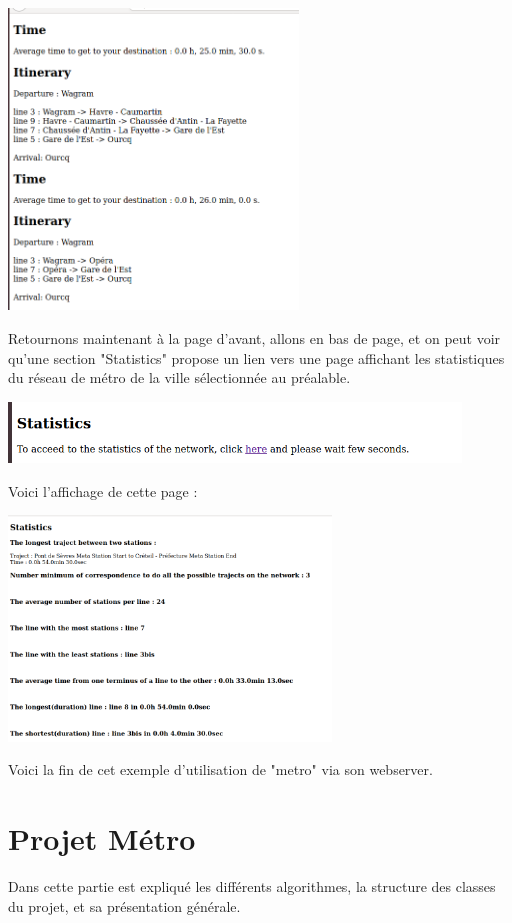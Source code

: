 \documentclass[french, 12pt]{article}
\begin{document}
\includegraphics[height=8cm]{images/itineraryWithPbs.png}

Retournons maintenant à la page d'avant, allons en bas de page, et on peut voir qu'une section "Statistics" propose un lien vers une page affichant les statistiques du réseau de métro de la ville sélectionnée au préalable.

\includegraphics[width=12cm]{images/acceedStats.png}

Voici l'affichage de cette page :

\includegraphics[height=6cm]{images/stats.png}

Voici la fin de cet exemple d'utilisation de "metro" via son webserver.



\newpage

\part{Projet Métro}
Dans cette partie est expliqué les différents algorithmes, la structure des classes du  projet, et sa présentation générale.
\end{document}
